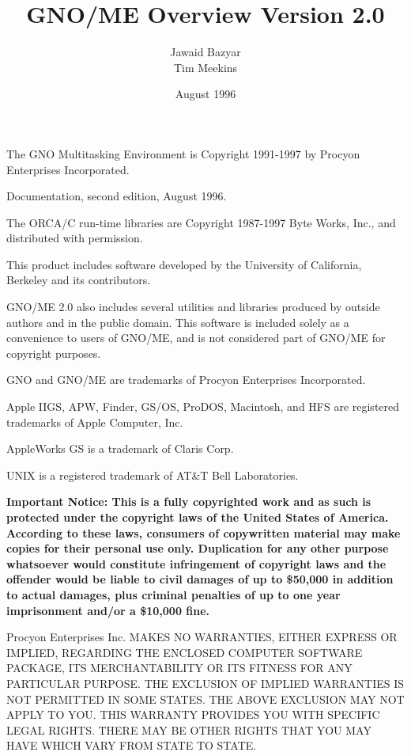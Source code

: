 %
%
% 



\title{GNO/ME Overview Version 2.0}
\author{Jawaid Bazyar \\ Tim Meekins}
\date{August 1996}
\maketitle

\parindent=0pt
\parskip=1pc

The GNO Multitasking Environment is Copyright 1991-1997 by
Procyon Enterprises Incorporated.

Documentation, second edition, August 1996.

The ORCA/C run-time libraries are Copyright 1987-1997 Byte Works, Inc.,
and distributed with permission.

This product includes software developed by the University of California,
Berkeley and its contributors.

GNO/ME 2.0 also includes several utilities and libraries produced by
outside authors and in the public domain. This software is included
solely as a convenience to users of GNO/ME, and is not considered part
of GNO/ME for copyright purposes.

GNO and GNO/ME are trademarks of Procyon Enterprises Incorporated.

Apple IIGS, APW, Finder, GS/OS, ProDOS, Macintosh, and HFS are registered
trademarks of Apple Computer, Inc.

AppleWorks GS is a trademark of Claris Corp.

UNIX is a registered trademark of AT\&T Bell Laboratories.

\bf
Important Notice:
\rm
This is a fully 
copyrighted work and as such is protected under the copyright
laws of the United States of America. According to these laws,
consumers of copywritten material may make copies for their
personal use only. Duplication for any other purpose whatsoever
would constitute infringement of copyright laws and the offender
would be liable to civil damages of up to \$50,000 in addition to
actual damages, plus criminal penalties of up to one year
imprisonment and/or a \$10,000 fine.


Procyon Enterprises Inc.
MAKES NO
WARRANTIES, EITHER EXPRESS OR IMPLIED, REGARDING THE ENCLOSED
COMPUTER SOFTWARE PACKAGE, ITS MERCHANTABILITY OR ITS FITNESS FOR
ANY PARTICULAR PURPOSE. THE EXCLUSION OF IMPLIED WARRANTIES IS
NOT PERMITTED IN SOME STATES. THE ABOVE EXCLUSION MAY NOT APPLY
TO YOU. THIS WARRANTY PROVIDES YOU WITH SPECIFIC LEGAL RIGHTS.
THERE MAY BE OTHER RIGHTS THAT YOU MAY HAVE WHICH VARY FROM STATE
TO STATE.


